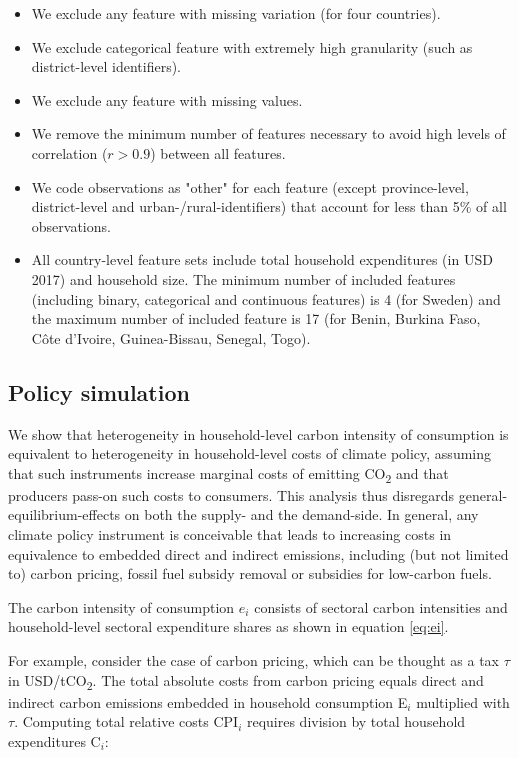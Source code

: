 \documentclass[12pt, a4paper]{article}
\begin{document}
\begin{refsection}
\begin{itemize}
    \item We exclude any feature with missing variation (for four countries).
    \item We exclude categorical feature with extremely high granularity (such as district-level identifiers).
    \item We exclude any feature with missing values.
    \item We remove the minimum number of features necessary to avoid high levels of correlation ($r>0.9$) between all features.
    \item We code observations as "other" for each feature (except province-level, district-level and urban-/rural-identifiers) that account for less than 5\% of all observations.
    \item All country-level feature sets include total household expenditures (in USD 2017) and household size. The minimum number of included features (including binary, categorical and continuous features) is 4 (for Sweden) and the maximum number of included feature is 17 (for Benin, Burkina Faso, Côte d'Ivoire, Guinea-Bissau, Senegal, Togo).
\end{itemize}

\subsection{Policy simulation}\label{sec:policysimulation}

We show that heterogeneity in household-level carbon intensity of consumption is equivalent to heterogeneity in household-level costs of climate policy, assuming that such instruments increase marginal costs of emitting CO\textsubscript{2} and that producers pass-on such costs to consumers. This analysis thus disregards general-equilibrium-effects on both the supply- and the demand-side. In general, any climate policy instrument is conceivable that leads to increasing costs in equivalence to embedded direct and indirect emissions, including (but not limited to) carbon pricing, fossil fuel subsidy removal or subsidies for low-carbon fuels.

The carbon intensity of consumption $e_{i}$ consists of sectoral carbon intensities and household-level sectoral expenditure shares as shown in equation \ref{eq:ei}. 

For example, consider the case of carbon pricing, which can be thought as a tax $\tau$ in USD/tCO\textsubscript{2}. The total absolute costs from carbon pricing equals direct and indirect carbon emissions embedded in household consumption E$_{i}$ multiplied with $\tau$. Computing total relative costs CPI$_{i}$ requires division by total household expenditures C$_{i}$:


\end{refsection}
\end{document}
